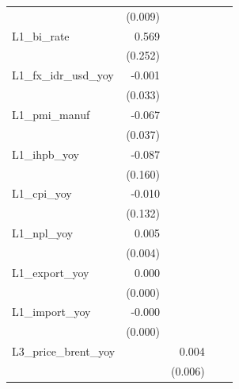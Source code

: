 {\begin{tabular}{l*{4}{D{.}{.}{-1}}}
                &  (0.009)         &                  &                  &                  \\
\addlinespace
L1\_bi\_rate      &    0.569\sym{**} &                  &                  &                  \\
                &  (0.252)         &                  &                  &                  \\
\addlinespace
L1\_fx\_idr\_usd\_yoy&   -0.001         &                  &                  &                  \\
                &  (0.033)         &                  &                  &                  \\
\addlinespace
L1\_pmi\_manuf    &   -0.067\sym{*}  &                  &                  &                  \\
                &  (0.037)         &                  &                  &                  \\
\addlinespace
L1\_ihpb\_yoy     &   -0.087         &                  &                  &                  \\
                &  (0.160)         &                  &                  &                  \\
\addlinespace
L1\_cpi\_yoy      &   -0.010         &                  &                  &                  \\
                &  (0.132)         &                  &                  &                  \\
\addlinespace
L1\_npl\_yoy      &    0.005         &                  &                  &                  \\
                &  (0.004)         &                  &                  &                  \\
\addlinespace
L1\_export\_yoy   &    0.000         &                  &                  &                  \\
                &  (0.000)         &                  &                  &                  \\
\addlinespace
L1\_import\_yoy   &   -0.000         &                  &                  &                  \\
                &  (0.000)         &                  &                  &                  \\
\addlinespace
L3\_price\_brent\_yoy&                  &    0.004         &                  &                  \\
                &                  &  (0.006)         &                  &                  \\

\end{tabular}}
